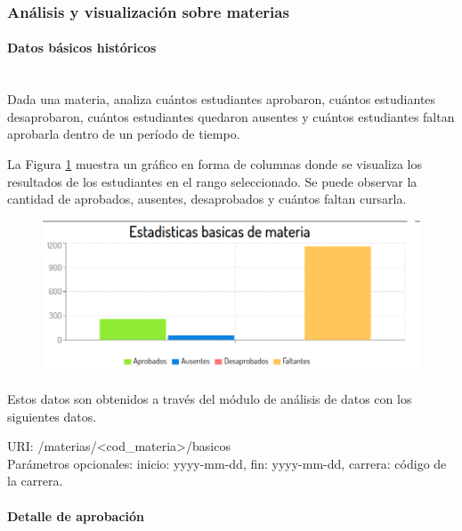 \subsubsection{Análisis y visualización sobre materias}

\paragraph{Datos básicos históricos} \mbox{}\\

Dada una materia, analiza cuántos estudiantes aprobaron, cuántos estudiantes desaprobaron, cuántos estudiantes quedaron ausentes y cuántos estudiantes faltan aprobarla dentro de un período de tiempo.

La Figura \ref{fig:sa-datos-basico} muestra un gráfico en forma de columnas donde se visualiza los resultados de los estudiantes en el rango seleccionado. Se puede observar la cantidad de aprobados, ausentes, desaprobados y cuántos faltan cursarla.

\begin{figure}[H]
  \centering
    \includegraphics[scale=0.4]{images/seguimiento-academico/sa-datosbasicos.png}
  \label{fig:sa-datos-basico}
\end{figure}

Estos datos son obtenidos a través del módulo de análisis de datos con los siguientes datos.

URI: /materias/<cod\_materia>/basicos \\

Parámetros opcionales: inicio: yyyy-mm-dd, fin: yyyy-mm-dd, carrera: código de la carrera. \\

\paragraph{Detalle de aprobación}\mbox{}\\

